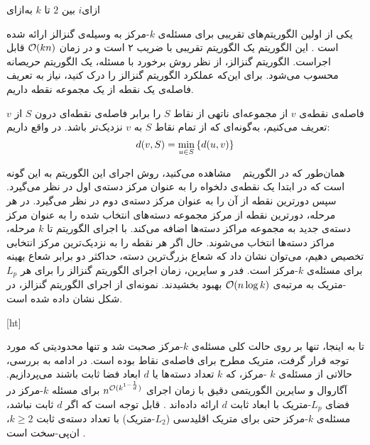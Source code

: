 ‌ازای{$i$ بین $2$ تا $k$}
‌به‌ازای

یکی از اولین الگوریتم‌های تقریبی برای مسئله‌ی $k$-مرکز به وسیله‌ی گنزالز ارائه شده است . این الگوریتم یک الگوریتم تقریبی با ضریب ۲ است و در زمان $\mathcal{O}(kn)$ قابل اجراست. الگوریتم گنزالز، از نظر روش برخورد با مسئله، یک الگوریتم حریصانه محسوب می‌شود. برای این‌که عملکرد الگوریتم گنزالز را درک کنید، نیاز به تعریف فاصله‌ی یک نقطه از یک مجموعه نقطه داریم.

فاصله‌ی نقطه‌ی $v$ از مجموعه‌ای ناتهی از نقاط $S$ را برابر فاصله‌ی نقطه‌ای درون $S$ از $v$ تعریف می‌کنیم، به‌گونه‌ای که از تمام نقاط $S$ به $v$ نزدیک‌تر باشد. در واقع داریم:
$$d(v, S) = \min_{u \in S} \left\{  d(u, v)  \right\}$$

همان‌طور که در الگوریتم ~ مشاهده می‌کنید، روش اجرای این الگوریتم به این گونه است که در ابتدا یک نقطه‌ی دلخواه را به عنوان مرکز دسته‌ی اول در نظر می‌گیرد.
سپس دورترین نقطه از آن را به عنوان مرکز دسته‌ی دوم در نظر می‌گیرد.
در هر مرحله، دورترین نقطه از مرکز مجموعه دسته‌های انتخاب شده را به عنوان مرکز دسته‌ی جدید به مجموعه مراکز دسته‌ها اضافه می‌کند.
با اجرای الگوریتم تا $k$ مرحله، مراکز دسته‌ها انتخاب می‌شوند.
حال اگر هر نقطه را به نزدیک‌ترین مرکز انتخابی تخصیص دهیم، می‌توان نشان داد که شعاع بزرگ‌ترین دسته، حداکثر دو برابر شعاع بهینه برای مسئله‌ی $k$-مرکز است.
فدر و سایرین، زمان اجرای الگوریتم گنزالز را برای هر $L_p$-متریک به مرتبه‌ی $\mathcal{O}(n \log{k})$ بهبود بخشیدند.
نمونه‌ای از اجرای الگوریتم گنزالز، در شکل  نشان داده شده است.

[ht]

تا به اینجا، تنها بر روی حالت کلی مسئله‌ی $k$-مرکز صحبت شد و تنها محدودیتی که مورد توجه قرار گرفت، متریک مطرح برای فاصله‌ی نقاط بوده است.
در ادامه به بررسی، حالاتی از مسئله‌ی $k$ -مرکز، که $k$ تعداد دسته‌ها یا $d$ ابعاد فضا ثابت باشند می‌پردازیم.
آگاروال و سایرین الگوریتمی دقیق با زمان اجرای $n^{\mathcal{O}(k^{1 - \frac{1}{d}})}$ برای مسئله $k$-مرکز در فضای $L_p$-متریک با ابعاد ثابت $d$ ارائه داده‌اند .
قابل توجه است که اگر $d$ ثابت نباشد، مسئله‌ی $k$-مرکز حتی برای متریک اقلیدسی ($L_2$-متریک) با تعداد دسته‌ی ثابت $k \geq 2$، ان‌پی-سخت است .

